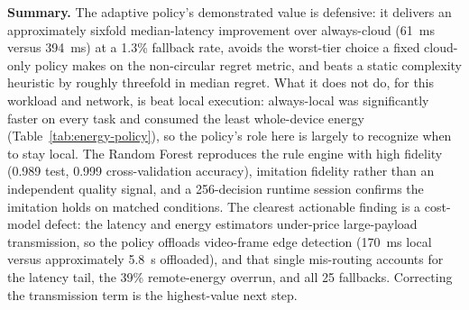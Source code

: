 \textbf{Summary.}
The adaptive policy's demonstrated value is defensive: it delivers an
approximately sixfold median-latency improvement over always-cloud (61~ms versus
394~ms) at a 1.3\% fallback rate, avoids the worst-tier choice a fixed cloud-only
policy makes on the non-circular regret metric, and beats a static complexity
heuristic by roughly threefold in median regret. What it does not do, for this
workload and network, is beat local execution: always-local was significantly
faster on every task and consumed the least whole-device energy
(Table~\ref{tab:energy-policy}), so the policy's role here is largely to recognize
when to stay local. The Random Forest reproduces the rule engine with high
fidelity (0.989 test, 0.999 cross-validation accuracy), imitation fidelity rather
than an independent quality signal, and a 256-decision runtime session confirms
the imitation holds on matched conditions. The clearest actionable finding is a
cost-model defect: the latency and energy estimators under-price large-payload
transmission, so the policy offloads video-frame edge detection (170~ms local
versus approximately 5.8~s offloaded), and that single mis-routing accounts for
the latency tail, the 39\% remote-energy overrun, and all 25 fallbacks.
Correcting the transmission term is the highest-value next step.

